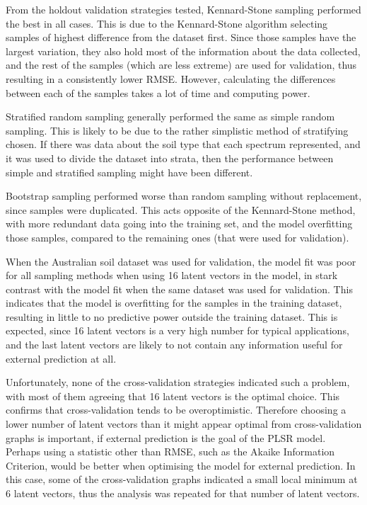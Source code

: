 \documentclass{isprs}
\begin{document}
From the holdout validation strategies tested, Kennard-Stone sampling performed the best in all cases. This is due to the Kennard-Stone algorithm selecting samples of highest difference from the dataset first. Since those samples have the largest variation, they also hold most of the information about the data collected, and the rest of the samples (which are less extreme) are used for validation, thus resulting in a consistently lower RMSE. However, calculating the differences between each of the samples takes a lot of time and computing power.

Stratified random sampling generally performed the same as simple random sampling. This is likely to be due to the rather simplistic method of stratifying chosen. If there was data about the soil type that each spectrum represented, and it was used to divide the dataset into strata, then the performance between simple and stratified sampling might have been different.

Bootstrap sampling performed worse than random sampling without replacement, since samples were duplicated. This acts opposite of the Kennard-Stone method, with more redundant data going into the training set, and the model overfitting those samples, compared to the remaining ones (that were used for validation).

When the Australian soil dataset was used for validation, the model fit was poor for all sampling methods when using 16 latent vectors in the model, in stark contrast with the model fit when the same dataset was used for validation. This indicates that the model is overfitting for the samples in the training dataset, resulting in little to no predictive power outside the training dataset. This is expected, since 16 latent vectors is a very high number for typical applications, and the last latent vectors are likely to not contain any information useful for external prediction at all.

Unfortunately, none of the cross-validation strategies indicated such a problem, with most of them agreeing that 16 latent vectors is the optimal choice. This confirms that cross-validation tends to be overoptimistic. Therefore choosing a lower number of latent vectors than it might appear optimal from cross-validation graphs is important, if external prediction is the goal of the PLSR model. Perhaps using a statistic other than RMSE, such as the Akaike Information Criterion, would be better when optimising the model for external prediction. In this case, some of the cross-validation graphs indicated a small local minimum at 6 latent vectors, thus the analysis was repeated for that number of latent vectors.
\end{document}
